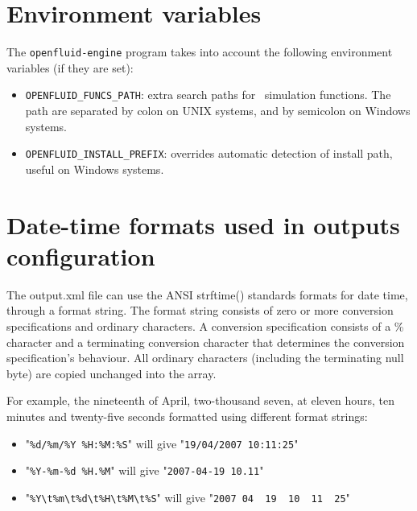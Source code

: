 \section{Environment variables}

The \texttt{openfluid-engine} program takes into account the following environment
variables (if they are set):
\begin{itemize}
\item \texttt{OPENFLUID\_FUNCS\_PATH}: extra search paths for \OFEname \ simulation functions. The path are separated by colon on UNIX systems, and by semicolon on Windows systems. 
\item \texttt{OPENFLUID\_INSTALL\_PREFIX}: overrides automatic detection of install path, useful on Windows systems.
\end{itemize}



\section{Date-time formats used in outputs configuration}

The output.xml file can use the ANSI strftime() standards formats for date time, through a format string. 
The format string consists of zero or more conversion specifications and ordinary characters.
A conversion specification consists of a \% character and a terminating conversion character that determines the conversion specification's behaviour.
All ordinary characters (including the terminating null byte) are copied unchanged into the array.

\bigskip

For example, the nineteenth of April, two-thousand seven, at eleven hours, ten minutes and twenty-five seconds formatted using different format strings:
\begin{itemize}
\item "\verb|%d/%m/%Y %H:%M:%S|" will give "\verb|19/04/2007 10:11:25|"
\item "\verb|%Y-%m-%d %H.%M|" will give "\verb|2007-04-19 10.11|"
\item "\verb|%Y\t%m\t%d\t%H\t%M\t%S|" will give "\verb|2007	04	19	10	11	25|"
\end{itemize}

